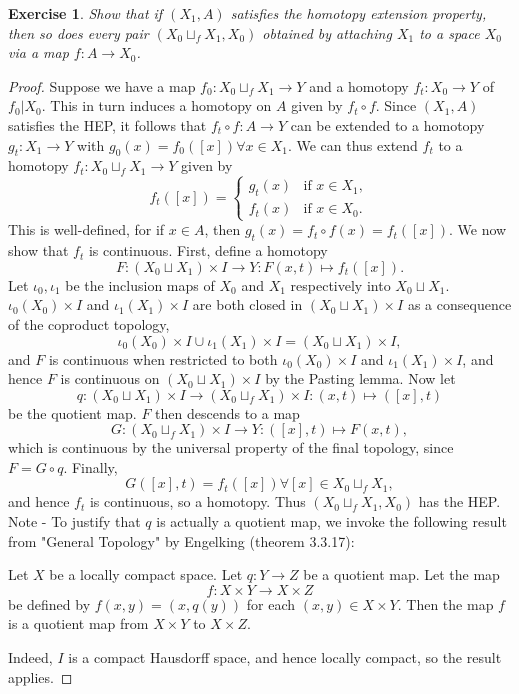 \documentclass{article}
\newtheorem{exercise}[theorem]{Exercise}
\begin{document}
\begin{exercise}
Show that if $(X_1,A)$ satisfies the homotopy extension property, then so does every pair $(X_0\sqcup_fX_1,X_0)$ obtained by attaching $X_1$ to a space $X_0$ via a map $f:A\to X_0$.
\end{exercise}
\begin{proof}
Suppose we have a map $f_0:X_0\sqcup_fX_1\to Y$ and a homotopy $f_t:X_0\to Y$ of $f_0|X_0$. This in turn induces a homotopy on $A$ given by $f_t\circ f$. Since $(X_1,A)$ satisfies the HEP, it follows that $f_t\circ f:A\to Y$ can be extended to a homotopy $g_t:X_1\to Y$ with $g_0(x)=f_0([x])\forall x\in X_1$. We can thus extend $f_t$ to a homotopy $f_t:X_0\sqcup_fX_1\to Y$ given by \[f_t([x])=\begin{cases}
    g_t(x)&\text{if }x\in X_1,\\
    f_t(x)&\text{if }x\in X_0.
\end{cases}\]This is well-defined, for if $x\in A$, then $g_t(x)=f_t\circ f(x)=f_t([x])$. We now show that $f_t$ is continuous. First, define a homotopy \[F:(X_0\sqcup X_1)\times I\to Y:F(x,t)\mapsto f_t([x]).\] Let $\iota_0,\iota_1$ be the inclusion maps of $X_0$ and $X_1$ respectively into $X_0\sqcup X_1$. $\iota_0(X_0)\times I$ and $\iota_1(X_1)\times I$ are both closed in $(X_0\sqcup X_1)\times I$ as a consequence of the coproduct topology, \[\iota_0(X_0)\times I\cup \iota_1(X_1)\times I=(X_0\sqcup X_1)\times I,\] and $F$ is continuous when restricted to both $\iota_0(X_0)\times I$ and $\iota_1(X_1)\times I$, and hence $F$ is continuous on $(X_0\sqcup X_1)\times I$ by the Pasting lemma. Now let \[q:(X_0\sqcup X_1)\times I\to (X_0\sqcup_fX_1)\times I:(x,t)\mapsto([x],t)\] be the quotient map. $F$ then descends to a map \[G:(X_0\sqcup_fX_1)\times I\to Y:([x],t)\mapsto F(x,t),\] which is continuous by the universal property of the final topology, since $F=G\circ q$. Finally, \[G([x],t)=f_t([x])\forall[x]\in X_0\sqcup_fX_1,\] and hence $f_t$ is continuous, so a homotopy. Thus $(X_0\sqcup_fX_1,X_0)$ has the HEP. 
\newline Note - To justify that $q$ is actually a quotient map, we invoke the following result from "General Topology" by Engelking (theorem 3.3.17):\newline

\noindent Let $X$  be a locally compact space. Let $q:Y\to Z$ be a quotient map. Let the map \[f:X\times Y\to X\times Z\] be defined by $f(x,y)=(x,q(y))$ for each $(x,y)\in X\times Y$. Then the map $f$ is a quotient map from $X\times Y$ to $X\times Z$.

Indeed, $I$ is a compact Hausdorff space, and hence locally compact, so the result applies.
\end{proof}
\end{document}
